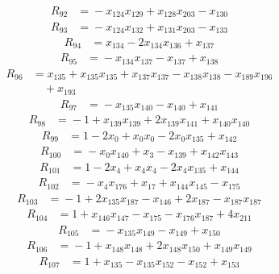 \begin{align*}
R_{92}&={}-x_{124}x_{129} +x_{128}x_{203} -x_{130}
\end{align*}
\begin{align*}
R_{93}&={}-x_{124}x_{132} +x_{131}x_{203} -x_{133}
\end{align*}
\begin{align*}
R_{94}&={}x_{134} -2x_{134}x_{136} +x_{137}
\end{align*}
\begin{align*}
R_{95}&={}-x_{134}x_{137} -x_{137} +x_{138}
\end{align*}
\begin{align*}
R_{96}&={}x_{135} +x_{135}x_{135} +x_{137}x_{137} -x_{138}x_{138} -x_{189}x_{196}\\
&\quad{}+x_{193}
\end{align*}
\begin{align*}
R_{97}&={}-x_{135}x_{140} -x_{140} +x_{141}
\end{align*}
\begin{align*}
R_{98}&={}-1 +x_{139}x_{139} +2x_{139}x_{141} +x_{140}x_{140}
\end{align*}
\begin{align*}
R_{99}&={}1 -2x_{0} +x_{0}x_{0} -2x_{0}x_{135} +x_{142}
\end{align*}
\begin{align*}
R_{100}&={}-x_{0}x_{140} +x_{3} -x_{139} +x_{142}x_{143}
\end{align*}
\begin{align*}
R_{101}&={}1 -2x_{4} +x_{4}x_{4} -2x_{4}x_{135} +x_{144}
\end{align*}
\begin{align*}
R_{102}&={}-x_{4}x_{176} +x_{17} +x_{144}x_{145} -x_{175}
\end{align*}
\begin{align*}
R_{103}&={}-1 +2x_{135}x_{187} -x_{146} +2x_{187} -x_{187}x_{187}
\end{align*}
\begin{align*}
R_{104}&={}1 +x_{146}x_{147} -x_{175} -x_{176}x_{187} +4x_{211}
\end{align*}
\begin{align*}
R_{105}&={}-x_{135}x_{149} -x_{149} +x_{150}
\end{align*}
\begin{align*}
R_{106}&={}-1 +x_{148}x_{148} +2x_{148}x_{150} +x_{149}x_{149}
\end{align*}
\begin{align*}
R_{107}&={}1 +x_{135} -x_{135}x_{152} -x_{152} +x_{153}
\end{align*}
